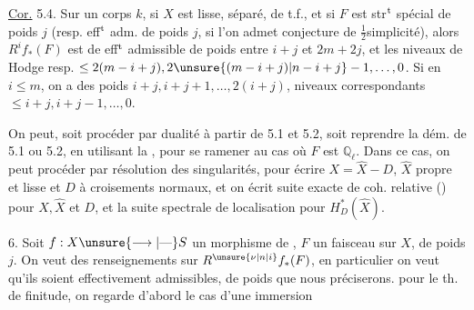 

\uline{Cor.} 5.4. Sur un corps $k$, si $X$ est lisse, séparé, de t.f., et si $F$ est  str$^{\rm t}$ spécial de poids $j$ (resp. eff$^{\rm t}$ adm. de poids $j$, si l'on admet conjecture de $\tfrac{1}{2}$simplicité), alors $R^i f_*(F)$ est de eff$^{\rm t}$ admissible de poids entre $i+j$ et $2m+2j$, et les niveaux  de Hodge resp. $\leq 2(m-i+j),2\unsure{(m-i+j)|n-i+j}-1,\ldots,0$. Si en \unsure{$+$} $i\leq m$, on a   des poids  $i+j,i+j+1,\ldots,2(i+j)$,  niveaux correspondants $\leq i+j,i+j-1,\ldots,0$.

On peut, soit procéder par dualité à partir de 5.1 et 5.2, soit reprendre  la dém. de 5.1 ou 5.2, en utilisant la  , pour se ramener au cas où $F$ est $\mathbb Q_\ell$. Dans ce cas, on peut procéder par  résolution des singularités, pour écrire $X=\widehat X-D$, $\widehat X$  propre et lisse et $D$  à croisements normaux, et on écrit suite exacte de coh. relative () pour $X,\widehat X$ et $D$, et la suite spectrale de localisation pour $H^{*}_D(\widehat X)$.


6. Soit $f:X\unsure{\longrightarrow|\text{---}}S$ un morphisme de , $F$ un faisceau   sur $X$, de poids $j$. On veut des renseignements sur  $R^{\unsure{\nu|n|i}}f_*(F)$, en particulier on veut qu'ils soient effectivement admissibles, de poids que nous préciserons.   pour le th. de finitude, on regarde d'abord le cas d'une immersion

